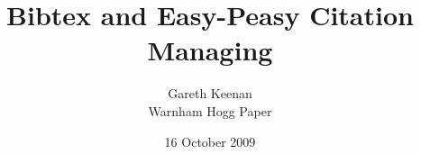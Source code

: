 \documentclass[12pt,letterpaper]{article}
\title{Bibtex and Easy-Peasy Citation Managing}
\author{Gareth Keenan\\Warnham Hogg Paper}
\date{16 October 2009}
\begin{document}
	
	
	
	\maketitle
	
	\cite{huang83}
	
	\cite[pp.115--6]{kratzer96}
	
	\citep{borer05}
	
	\citep[p.15ff]{bennett09}
	
	\citet[pp.23]{dealToAppear}
	
	\citeyear{picallo85}
	
	\cite{naatanen97,borer05}
	
	
	
\end{document}
